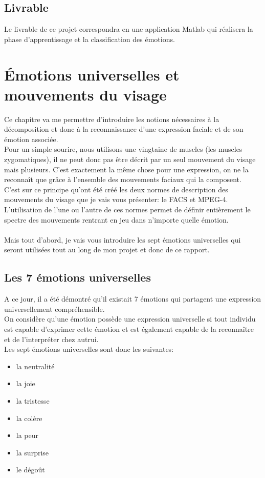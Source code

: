 \documentclass[poster]{polytech/polytech}
\begin{document}
\section{Livrable}
Le livrable de ce projet correspondra en une application Matlab qui réalisera la phase d'apprentissage et la classification des émotions.

\chapter{Émotions universelles et \mbox{mouvements} du visage}
\label{chap:chap_emotions}

Ce chapitre va me permettre d'introduire les notions nécessaires à la décomposition et donc à la reconnaissance d'une expression faciale et de son émotion associée.\\
Pour un simple sourire, nous utilisons une vingtaine de muscles (les muscles zygomatiques), il ne peut donc pas être décrit par un seul mouvement du visage mais plusieurs. C'est exactement la même chose pour une expression, on ne la reconnaît que grâce à l'ensemble des mouvements faciaux qui la composent.\\
C'est sur ce principe qu'ont été créé les deux normes de description des mouvements du visage que je vais vous présenter: le FACS et MPEG-4.\\
L'utilisation de l'une ou l'autre de ces normes permet de définir entièrement le spectre des mouvements rentrant en jeu dans n'importe quelle émotion.\\
\\
Mais tout d'abord, je vais vous introduire les sept émotions universelles qui seront utilisées tout au long de mon projet et donc de ce rapport.

\newpage
\section{Les 7 émotions universelles}
\label{sec:expr_uni}

A ce jour, il a été démontré qu'il existait 7 émotions qui partagent une expression universellement compréhensible.\\
On considère qu'une émotion possède une expression universelle si tout individu est capable d'exprimer cette émotion et est également capable de la reconnaître et de l'interpréter chez autrui.\\
Les sept émotions universelles sont donc les suivantes:
\begin{itemize}
	\item la neutralité
	\item la joie
	\item la tristesse
	\item la colère
	\item la peur
	\item la surprise
	\item le dégoût
\end{itemize}
\end{document}

